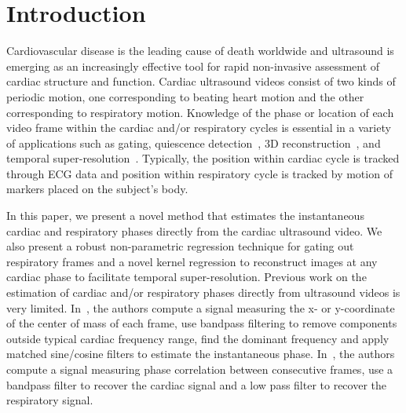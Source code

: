 \documentclass[runningheads,a4paper]{llncs}
\begin{document}
\section{Introduction}
\label{sec:intro}
%
Cardiovascular disease is the leading cause of death worldwide and ultrasound is emerging as an increasingly effective tool for rapid non-invasive assessment of cardiac structure and function. Cardiac ultrasound videos consist of two kinds of periodic motion, one corresponding to beating heart motion and the other corresponding to respiratory motion. Knowledge of the phase or location of each video frame within the cardiac and/or respiratory cycles is essential in a variety of applications such as gating\cite{VonBirgelen1997}, quiescence detection~\cite{Wick2013}, 3D reconstruction~\cite{Wachinger2012}, and temporal super-resolution~\cite{Cherin2006}. Typically, the position within cardiac cycle is tracked through ECG data and position within respiratory cycle is tracked by motion of markers placed on the subject's body\cite{Khamene2004}. 

	In this paper, we present a novel method that estimates the instantaneous cardiac and respiratory phases directly from the cardiac ultrasound video. We also present a robust non-parametric regression technique for gating out respiratory frames and a novel kernel regression to reconstruct images at any cardiac phase to facilitate temporal super-resolution. Previous work on the estimation of cardiac and/or respiratory phases directly from ultrasound videos is very limited. In~\cite{Karadayi2006}, the authors compute a signal measuring the x- or y-coordinate of the center of mass of each frame, use bandpass filtering to remove components outside typical cardiac frequency range, find the dominant frequency and apply matched sine/cosine filters to estimate the instantaneous phase. In~\cite{Sundar2009}, the authors compute a signal measuring phase correlation between consecutive frames, use a bandpass filter to recover the cardiac signal and a low pass filter to recover the respiratory signal. 
%
\vspace{-0.5cm}
\end{document}
